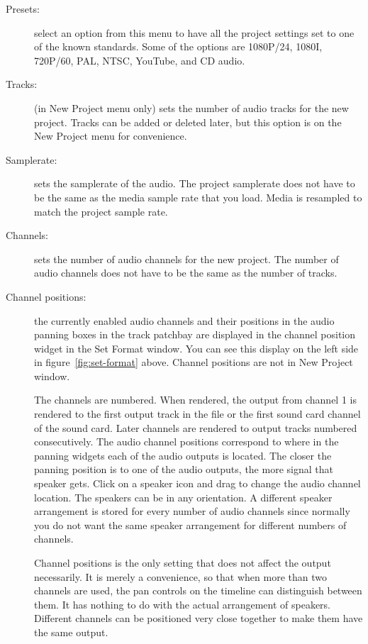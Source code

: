 \begin{description}
            \item[Presets:]
            select an option from this menu to have all the project settings set to one of the known standards.  Some of the options are 1080P/24, 1080I, 720P/60, PAL, NTSC, YouTube, and CD audio.
            
            \item[Tracks:]
            (in New Project menu only) sets the number of audio tracks for the new project. Tracks can be added or deleted later, but this option is on the New Project menu for convenience.
            
            \item[Samplerate:]
            sets the samplerate of the audio. The project samplerate does not have to be the same as the media sample rate that you load. Media is resampled to match the project sample rate.
            
            \item[Channels:]
            sets the number of audio channels for the new project. The number of audio channels does not have to be the same as the number of tracks.
            
            \item[Channel positions:]
            the currently enabled audio channels and their positions in the audio panning boxes in the track patchbay are displayed in the channel position widget in the Set Format window.  
            You can see this display on the left side in figure~\ref{fig:set-format} above. 
            Channel positions are not in New Project window.
            
            The channels are numbered. 
            When rendered, the output from channel 1 is rendered to the first output track in the file or the first sound card channel of the sound card. 
            Later channels are rendered to output tracks numbered consecutively. 
            The audio channel positions correspond to where in the panning widgets each of the audio outputs is located. 
            The closer the panning position is to one of the audio outputs, the more signal that speaker gets. 
            Click on a speaker icon and drag to change the audio channel location. 
            The speakers can be in any orientation. 
            A different speaker arrangement is stored for every number of audio channels since normally you do not want the same speaker arrangement for different numbers of channels.
            
            Channel positions is the only setting that does not affect the output necessarily. 
            It is merely a convenience, so that when more than two channels are used, the pan controls on the timeline can distinguish between them. 
            It has nothing to do with the actual arrangement of speakers. 
            Different channels can be positioned very close together to make them have the same output.
            
\end{description}

